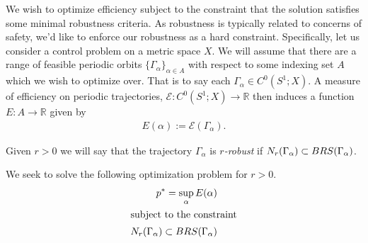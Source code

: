 We wish to optimize efficiency subject to the constraint that the solution satisfies some minimal robustness criteria.  As robustness is typically related to concerns of safety, we'd like to enforce our robustness as a hard constraint.
Specifically, let us consider a control problem on a metric space $X$.
We will assume that there are a range of feasible periodic orbits $\{ \Gamma_{\alpha} \}_{\alpha \in A}$ with respect to some indexing set $A$
which we wish to optimize over.
That is to say each $\Gamma_{\alpha} \in C^{0}( S^{1} ; X)$.
A measure of efficiency on periodic trajectories, $\mathcal{E}: C^{0}( S^{1} ; X) \to \mathbb{R}$ then induces a function $E:A\to \mathbb{R}$ given by
\begin{align*}
	E( \alpha) := \mathcal{E}( \Gamma_{\alpha}).
\end{align*}

Given $r > 0$ we will say that the trajectory $\Gamma_{\alpha}$ is \emph{ $r$-robust} if $N_{r}(\Gamma_{\alpha}) \subset BRS(\Gamma_{\alpha})$.

We seek to solve the following optimization problem for $r > 0$.
\begin{align*}
	p^{*} = \sup_{\alpha} E(\alpha) \\
\intertext{subject to the constraint}
	N_{r}(\Gamma_{\alpha}) \subset BRS(\Gamma_{\alpha})
\end{align*}